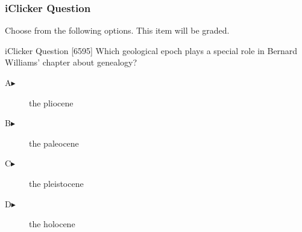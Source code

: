 \begin{frame}
  \frametitle{iClicker Question}
Choose from the following options. This item will be graded.
\begin{block}{iClicker Question}
[6595] Which geological epoch plays a special role in Bernard Williams' chapter about genealogy?
\end{block}
\begin{description}
\item[A\hspace{.2in}$\blacktriangleright$] the pliocene
\item[B\hspace{.2in}$\blacktriangleright$] the paleocene
\item[C\hspace{.2in}$\blacktriangleright$] the pleistocene
\item[D\hspace{.2in}$\blacktriangleright$] the holocene
\end{description}
\end{frame}